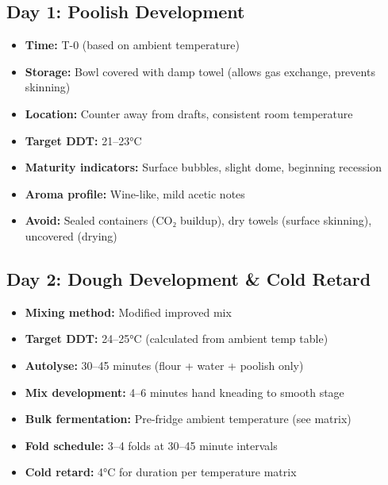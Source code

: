 \documentclass[10pt,a4paper]{article}
\begin{document}
    \subsection{Day 1: Poolish Development}
    \begin{itemize}[leftmargin=*]
        \item \textbf{Time:} T-0 (based on ambient temperature)
        \item \textbf{Storage:} Bowl covered with damp towel (allows gas exchange, prevents skinning)
        \item \textbf{Location:} Counter away from drafts, consistent room temperature
        \item \textbf{Target DDT:} 21--23°C
        \item \textbf{Maturity indicators:} Surface bubbles, slight dome, beginning recession
        \item \textbf{Aroma profile:} Wine-like, mild acetic notes
        \item \textbf{Avoid:} Sealed containers (CO₂ buildup), dry towels (surface skinning), uncovered (drying)
    \end{itemize}

    \subsection{Day 2: Dough Development \& Cold Retard}
    \begin{itemize}[leftmargin=*]
        \item \textbf{Mixing method:} Modified improved mix
        \item \textbf{Target DDT:} 24--25°C (calculated from ambient temp table)
        \item \textbf{Autolyse:} 30--45 minutes (flour + water + poolish only)
        \item \textbf{Mix development:} 4--6 minutes hand kneading to smooth stage
        \item \textbf{Bulk fermentation:} Pre-fridge ambient temperature (see matrix)
        \item \textbf{Fold schedule:} 3--4 folds at 30--45 minute intervals
        \item \textbf{Cold retard:} 4°C for duration per temperature matrix
    \end{itemize}
\end{document}
